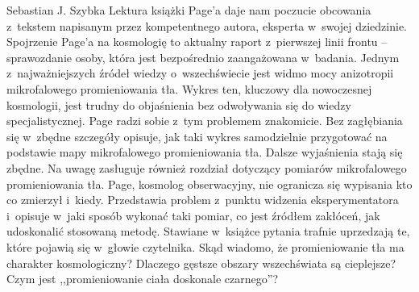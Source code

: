 \begin{newrevplenv}{Sebastian J. Szybka}
Lektura książki Page'a daje nam poczucie obcowania z~tekstem napisanym przez kompetentnego autora, eksperta w~swojej dziedzinie. Spojrzenie Page'a na kosmologię to aktualny raport z~pierwszej linii frontu -- sprawozdanie osoby, która jest bezpośrednio zaangażowana w~badania. Jednym z~najważniejszych źródeł wiedzy o~wszechświecie jest widmo mocy anizotropii mikrofalowego promieniowania tła. Wykres ten, kluczowy dla nowoczesnej kosmologii, jest trudny do objaśnienia bez odwoływania się do wiedzy specjalistycznej. Page radzi sobie z~tym problemem znakomicie. Bez zagłębiania się w~zbędne szczegóły opisuje, jak taki wykres samodzielnie przygotować na podstawie mapy mikrofalowego promieniowania tła. Dalsze wyjaśnienia stają się zbędne. Na uwagę zasługuje również rozdział dotyczący pomiarów mikrofalowego promieniowania tła. Page, kosmolog obserwacyjny, nie ogranicza się wypisania kto co zmierzył i~kiedy. Przedstawia problem z~punktu widzenia eksperymentatora i~opisuje w~jaki sposób wykonać taki pomiar, co jest źródłem zakłóceń, jak udoskonalić stosowaną metodę. Stawiane w~książce pytania trafnie uprzedzają te, które pojawią się w~głowie czytelnika. Skąd wiadomo, że promieniowanie tła ma charakter kosmologiczny? Dlaczego gęstsze obszary wszechświata są cieplejsze? Czym jest ,,promieniowanie ciała doskonale czarnego''?


\end{newrevplenv}
